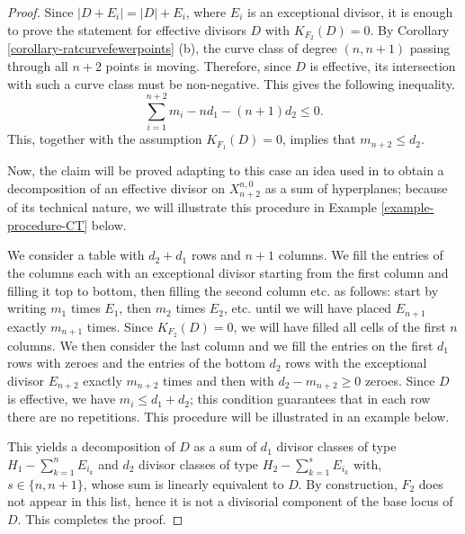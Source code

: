 \documentclass[a4paper,11pt]{article}
\begin{document}
\begin{proof}
Since $|D+E_i|=|D|+E_i$, where $E_i$ is an exceptional divisor, it is enough to prove the statement for effective divisors $D$ with $K_{F_2}(D)=0$. 
By Corollary \ref{corollary-ratcurvefewerpoints} (b), the curve class of degree $(n,n+1)$ passing through all $n+2$ points is moving. Therefore, since $D$ is effective, its intersection with such a curve class must be non-negative. This gives the following inequality.
$$
\sum_{i=1}^{n+2}m_i- nd_1-(n+1)d_2\le0.
$$
This, together with the assumption $K_{F_1}(D)=0$, implies that $m_{n+2}\le d_2$.

Now, the claim will be proved  adapting to this case an idea used in \cite[Lemma 4.24]{CT06} to obtain a decomposition of an effective divisor on $X^{n,0}_{n+2}$ as a sum of hyperplanes; because of its technical nature, we will  illustrate this procedure in Example \ref{example-procedure-CT} below.


We consider a table with $d_2+d_1$ rows and $n+1$ columns. We fill the entries of the columns each with an exceptional divisor starting from the first column and filling it top to bottom, then filling the second column etc. as follows: start by writing  $m_1$ times $E_1$, then $m_2$ times $E_2$, etc. until we will have placed $E_{n+1}$ exactly $m_{n+1}$ times. Since $K_{F_2}(D)=0$, we will have filled all cells of the first $n$ columns. We then consider the last column and we fill the entries on the first $d_1$ rows with zeroes and the entries of the bottom $d_2$ rows with the exceptional divisor $E_{n+2}$ exactly $m_{n+2}$ times and then with $d_2-m_{n+2}\ge0$ zeroes. 
Since $D$ is effective, we have $m_i\le d_1+d_2$; this condition guarantees that in each row there are no repetitions. This procedure will be illustrated in an example below.

This yields a decomposition of $D$ as a sum of $d_1$ divisor classes of type $H_1-\sum_{k=1}^nE_{i_k}$ and $d_2$ divisor classes of type $H_2-\sum_{k=1}^{s}E_{i_k}$ with, $s\in\{n,n+1\}$, whose sum is linearly equivalent to $D$. 
By construction, $F_2$ does not appear in this list, hence it is not a divisorial component of the base locus of $D$. This completes the proof. 
\end{proof}
\end{document}

